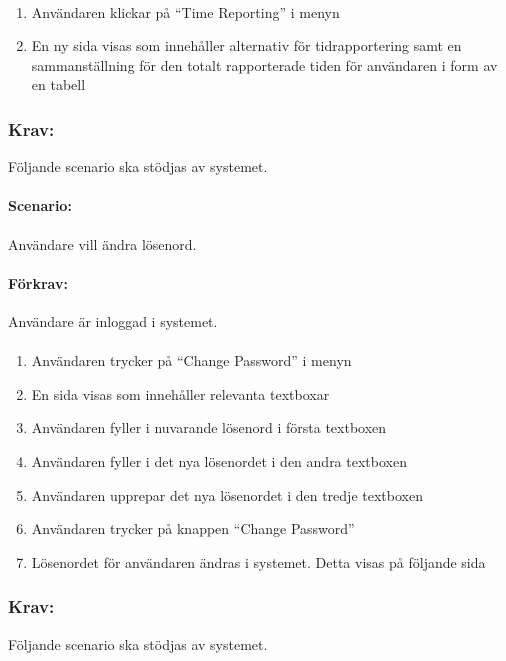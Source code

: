 \documentclass[paper=a4, fontsize=11pt,twoside]{article}
\begin{document}
	\paragraph{}
	\begin{enumerate}
		\item  Användaren klickar på “Time Reporting” i menyn
		\item  En ny sida visas som innehåller alternativ för tidrapportering samt en sammanställning för den totalt rapporterade tiden för användaren i form av en tabell
		
	\end{enumerate}
	\subsubsection{Krav:} Följande scenario ska stödjas av systemet.
	\paragraph{Scenario:}Användare vill ändra lösenord.
	\paragraph{Förkrav:}
	Användare är inloggad i systemet.
	\paragraph{}
	\begin{enumerate}
		\item	Användaren trycker på “Change Password” i menyn
		\item	En sida visas som innehåller relevanta textboxar
		\item	Användaren fyller i nuvarande lösenord i första textboxen
		\item	Användaren fyller i det nya lösenordet i den andra textboxen
		\item	Användaren upprepar det nya lösenordet i den tredje textboxen
		\item	Användaren trycker på knappen “Change Password”
		\item	Lösenordet för användaren ändras i systemet. Detta visas på följande sida
		
	\end{enumerate}
	
	\subsubsection{Krav:}Följande scenario ska stödjas av systemet.
\end{document}

